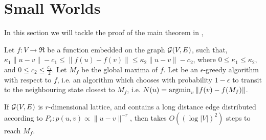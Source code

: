 \section{Small Worlds}
\label{sec:small-world-theory}

In this section we will tackle the proof of the main theorem in
,

\begin{theorem}
  Let $f : V \to \Re$ be a function embedded on the graph $\mathcal{G}(V,E)$,
  such that, $\kappa_1 \|u-v\| - c_1 \le \|f(u) - f(v)\| \le \kappa_2
  \|u - v\| - c_2$, where $0 \le \kappa_1 \le \kappa_2$, and $0 \le c_2
  \le \frac{c_1}{2}$. Let $M_f$ be the global maxima of $f$. Let
  \egreedyalgo be an $\epsilon$-greedy algorithm with respect to $f$,
  i.e.  an algorithm which chooses with probability $1-\epsilon$ to
  transit to the neighbouring state closest to $M_f$, i.e. $N(u)
  = \operatorname{argmin}_v \|f(v) - f(M_f)\|$.
  
  If $\mathcal{G}(V,E)$ is $r$-dimensional lattice, and contains a long
  distance edge distributed according to $P_r: p(u,v) \propto
  \|u-v\|^{-r}$, then \egreedyalgo takes $O( (\log |V|)^2 )$ steps to
  reach $M_f$.
\end{theorem}
